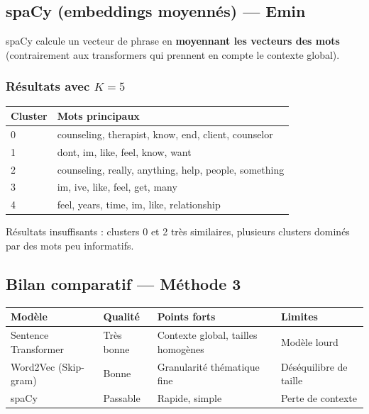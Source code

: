 \documentclass[12pt,a4paper]{article}
\begin{document}
\subsection{spaCy (embeddings moyennés) --- Emin}

spaCy calcule un vecteur de phrase en \textbf{moyennant les vecteurs des mots} (contrairement aux transformers qui prennent en compte le contexte global).

\subsubsection*{Résultats avec $K = 5$}

\begin{center}
\begin{tabular}{ll}
\toprule
\textbf{Cluster} & \textbf{Mots principaux} \\
\midrule
0 & counseling, therapist, know, end, client, counselor \\
1 & dont, im, like, feel, know, want \\
2 & counseling, really, anything, help, people, something \\
3 & im, ive, like, feel, get, many \\
4 & feel, years, time, im, like, relationship \\
\bottomrule
\end{tabular}
\end{center}

\begin{avertissement}
Résultats insuffisants : clusters 0 et 2 très similaires, plusieurs clusters dominés par des mots peu informatifs.
\end{avertissement}

\subsection{Bilan comparatif --- Méthode 3}

\begin{center}
\small
\begin{tabular}{llll}
\toprule
\textbf{Modèle} & \textbf{Qualité} & \textbf{Points forts} & \textbf{Limites} \\
\midrule
Sentence Transformer & Très bonne & Contexte global, tailles homogènes & Modèle lourd \\
Word2Vec (Skip-gram) & Bonne & Granularité thématique fine & Déséquilibre de taille \\
spaCy & Passable & Rapide, simple & Perte de contexte \\
\bottomrule
\end{tabular}
\end{center}
\end{document}

